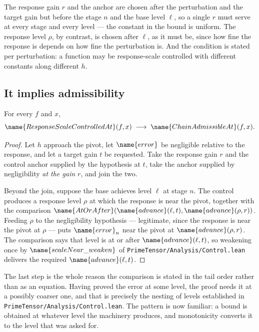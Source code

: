 \begin{remark}\label{Analysis:Growth:rem:quantifiers}
The response gain $r$ and the anchor are chosen after the perturbation and the
target gain but before the stage $n$ and the base level $\ell$, so a single $r$
must serve at every stage and every level --- the constant in the bound is
uniform.  The response level $\rho$, by contrast, is chosen after $\ell$, as it
must be, since how fine the response is depends on how fine the perturbation
is.  And the condition is stated per perturbation: a function may be
response-scale controlled with different constants along different $h$.
\end{remark}

\subsection{It implies admissibility}

\begin{theorem}
\label{Analysis:Growth:thm:implies}
For every $f$ and $x$,
\[
  \name{ResponseScaleControlledAt}(f,x)
  \;\longrightarrow\;
  \name{ChainAdmissibleAt}(f,x).
\]
\end{theorem}

\begin{proof}
Let $h$ approach the pivot, let $\name{error}$ be negligible relative to the
response, and let a target gain $t$ be requested.  Take the response gain $r$
and the control anchor supplied by the hypothesis at $t$, take the anchor
supplied by negligibility \emph{at the gain $r$}, and join the two.

Beyond the join, suppose the base achieves level $\ell$ at stage $n$.  The
control produces a response level $\rho$ at which the response is near the
pivot, together with the comparison
$\name{AtOrAfter}(\name{advance}(\ell,t), \name{advance}(\rho,r))$.  Feeding
$\rho$ to the negligibility hypothesis --- legitimate, since the response is
near the pivot at $\rho$ --- puts $\name{error}_n$ near the pivot at
$\name{advance}(\rho,r)$.  The comparison says that level is at or after
$\name{advance}(\ell,t)$, so weakening once by $\name{scaleNear\_weaken}$ of
\texttt{PrimeTensor/Analysis/Control.lean} delivers the required
$\name{advance}(\ell,t)$.
\end{proof}

\begin{remark}\label{Analysis:Growth:rem:monotone}
The last step is the whole reason the comparison is stated in the tail order
rather than as an equation.  Having proved the error at some level, the proof
needs it at a possibly coarser one, and that is precisely the nesting of levels
established in \texttt{PrimeTensor/Analysis/Control.lean}.  The pattern is now
familiar: a bound is obtained at whatever level the machinery produces, and
monotonicity converts it to the level that was asked for.
\end{remark}

